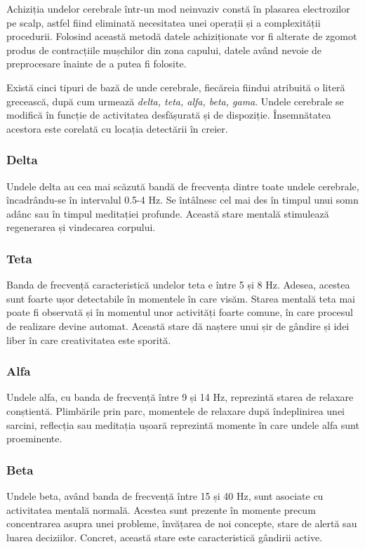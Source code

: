 Achiziția undelor cerebrale într-un mod neinvaziv constă în plasarea electrozilor pe scalp, astfel fiind eliminată necesitatea unei operații și a complexității procedurii. Folosind această metodă datele achiziționate vor fi alterate de zgomot produs de contracțiile mușchilor din zona capului, datele având nevoie de preprocesare înainte de a putea fi folosite.

Există cinci tipuri de bază de unde cerebrale, fiecăreia fiindui atribuită o literă grecească, după cum urmează \textit{delta, teta, alfa, beta, gama}. Undele cerebrale se modifică în funcție de activitatea desfășurată și de dispoziție. Însemnătatea acestora este corelată cu locația detectării în creier.

\subsubsection*{Delta}\label{ssch:delta}
Undele delta au cea mai scăzută bandă de frecvența dintre toate undele cerebrale, încadrându-se în intervalul 0.5-4 \si{\hertz}. Se întâlnesc cel mai des în timpul unui somn adânc sau în timpul meditației profunde. Această stare mentală stimulează regenerarea și vindecarea corpului.

\subsubsection*{Teta}\label{sush:teta}
Banda de frecvență caracteristică undelor teta e între 5 și 8 \si{\hertz}. Adesea, acestea sunt foarte ușor detectabile în momentele în care visăm. Starea mentală teta mai poate fi observată și în momentul unor activități foarte comune, în care procesul de realizare devine automat. Această stare dă naștere unui șir de gândire și idei liber în care creativitatea este sporită.

\subsubsection*{Alfa}\label{sush:alfa}
Undele alfa, cu banda de frecvență între 9 și 14 \si{\hertz},  reprezintă starea de relaxare conștientă. Plimbările prin parc, momentele de relaxare după îndeplinirea unei sarcini, reflecția  sau meditația ușoară reprezintă momente în care undele alfa sunt proeminente.

\subsubsection*{Beta}\label{sush:beta}
Undele beta, având banda de frecvență între 15 și 40 \si{\hertz}, sunt asociate cu activitatea mentală normală. Acestea sunt prezente în momente precum concentrarea asupra unei probleme, învățarea de noi concepte, stare de alertă sau luarea deciziilor. Concret, această stare este caracteristică gândirii active.

